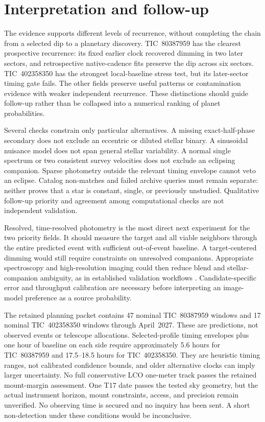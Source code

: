 \documentclass[11pt]{article}
\begin{document}

\clearpage

\clearpage

\clearpage

\section{Interpretation and follow-up}\label{sec:discussion}
The evidence supports different levels of recurrence, without completing the chain from a selected dip to a planetary discovery. TIC~80387959 has the clearest prospective recurrence: its fixed earlier clock recovered dimming in two later sectors, and retrospective native-cadence fits preserve the dip across six sectors. TIC~402358350 has the strongest local-baseline stress test, but its later-sector timing gate fails. The other fields preserve useful patterns or contamination evidence with weaker independent recurrence. These distinctions should guide follow-up rather than be collapsed into a numerical ranking of planet probabilities.

Several checks constrain only particular alternatives. A missing exact-half-phase secondary does not exclude an eccentric or diluted stellar binary. A sinusoidal nuisance model does not span general stellar variability. A normal single spectrum or two consistent survey velocities does not exclude an eclipsing companion. Sparse photometry outside the relevant timing envelope cannot veto an eclipse. Catalog non-matches and failed archive queries must remain separate: neither proves that a star is constant, single, or previously unstudied. Qualitative follow-up priority and agreement among computational checks are not independent validation.

Resolved, time-resolved photometry is the most direct next experiment for the two priority fields. It should measure the target and all viable neighbors through the entire predicted event with sufficient out-of-event baseline. A target-centered dimming would still require constraints on unresolved companions. Appropriate spectroscopy and high-resolution imaging could then reduce blend and stellar-companion ambiguity, as in established validation workflows \citep{giacalone2022,cacciapuoti2022,eisner2021}. Candidate-specific error and throughput calibration are necessary before interpreting an image-model preference as a source probability.

The retained planning packet contains 47 nominal TIC~80387959 windows and 17 nominal TIC~402358350 windows through April~2027. These are predictions, not observed events or telescope allocations. Selected-profile timing envelopes plus one hour of baseline on each side require approximately 5.6 hours for TIC~80387959 and 17.5--18.5 hours for TIC~402358350. They are heuristic timing ranges, not calibrated confidence bounds, and older alternative clocks can imply larger uncertainty. No full conservative LCO one-meter track passes the retained mount-margin assessment. One T17 date passes the tested sky geometry, but the actual instrument horizon, mount constraints, access, and precision remain unverified. No observing time is secured and no inquiry has been sent. A short non-detection under these conditions would be inconclusive.
\end{document}
